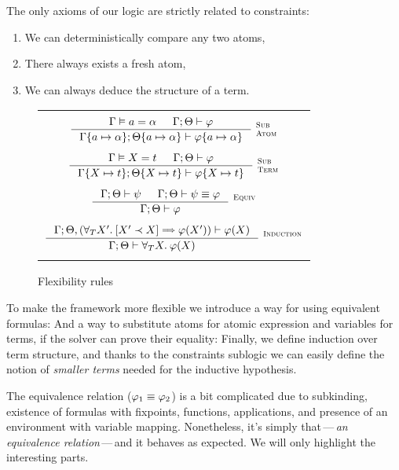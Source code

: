 \documentclass[english, mgr]{iithesis}
\renewcommand{\it}[1]{\textit{#1}}
\newcommand{\scbrk}[2]{\myatop{\textsc{#1}}{\textsc{#2}}}
\newcommand{\mdash}{\,---\,}
\def\-{{\mdash}}
\begin{document}
The only axioms of our logic are strictly related to constraints:
\begin{enumerate}
\item We can deterministically compare any two atoms,
\item There always exists a fresh atom,
\item We can always deduce the structure of a term.
\end{enumerate}

\newpage

\begin{figure}[htbp]
\centering
\begin{tabularx}{\textwidth}{|C|}
  \hline \\
$
  \inference{
    \cjgmnt[\cEnv]{\atomv \ceq \atomexp} &
    \jgmnt[\cEnv;\Theta]{\formphi}
    }{
    \jgmnt[\cEnv\{\atomv \mapsto \atomexp\};\Theta\{\atomv \mapsto \atomexp\}]{\formphi\{\atomv \mapsto \atomexp\}}
  }\:\scbrk{Sub}{Atom}
$ \\ \\ $
  \inference{
    \cjgmnt[\cEnv]{\termv \ceq \term} &
    \jgmnt[\cEnv;\Theta]{\formphi}
    }{
    \jgmnt[\cEnv\{\termv \mapsto \term\};\Theta\{\termv \mapsto \term\}]{\formphi\{\termv \mapsto \term\}}
  }\:\scbrk{Sub}{Term}
$ \\ \\ $
  \inference{
    \jgmnt[\cEnv;\Theta]{\psi} &
    \jgmnt[\cEnv;\Theta]{\psi \equiv \formphi}
    }{
    \jgmnt[\cEnv;\Theta]{\formphi}
  }\:\scbrk{Equiv}{}
$ \\ \\ $
  \inference{
    \jgmnt[\cEnv;\Theta, (\fForallTerm{\termv'} \fCImp{\termv' \cshlt \termv} \formphi(\termv'))]{\formphi(\termv)}
    }{
    \jgmnt[\cEnv;\Theta]{\fForallTerm{\termv} \formphi(\termv)}
  }\:\scbrk{Induction}{}
  $ \\ \\ \hline
\end{tabularx}
\caption{Flexibility rules}
\label{fig:flexibility}
\end{figure}
To make the framework more flexible we introduce a way for using equivalent formulas:
And a way to substitute atoms for atomic expression and variables for terms, if the solver can prove their equality:
Finally, we define induction over term structure,
and thanks to the constraints sublogic we can easily define the notion of
\it{smaller terms} needed for the inductive hypothesis.

\newpage

The equivalence relation ($\varphi_1 \equiv \varphi_2$) is a bit complicated
due to subkinding, existence of formulas
with fixpoints, functions, applications,
and presence of an environment with variable mapping.
Nonetheless, it's simply that\-\it{an equivalence relation}\-and it
behaves as expected. We will only highlight the interesting parts.
\end{document}
